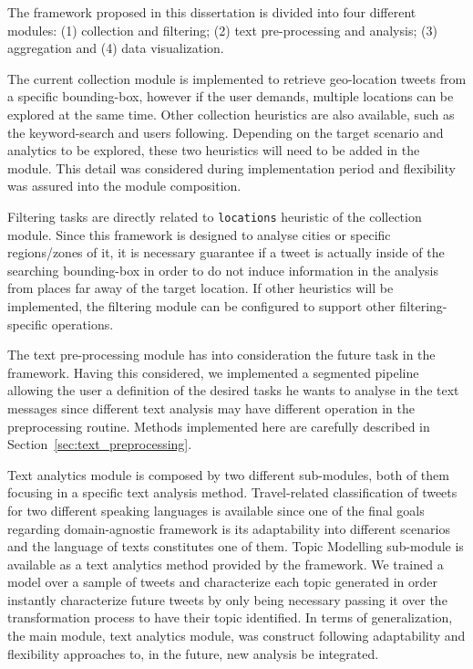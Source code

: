 The framework proposed in this dissertation is divided into four different modules: (1) collection and filtering; (2) text pre-processing and analysis; (3) aggregation and (4) data visualization.

The current collection module is implemented to retrieve geo-location tweets from a specific bounding-box, however if the user demands, multiple locations can be explored at the same time. Other collection heuristics are also available, such as the keyword-search and users following. Depending on the target scenario and analytics to be explored, these two heuristics will need to be added in the module. This detail was considered during implementation period and flexibility was assured into the module composition.

Filtering tasks are directly related to \texttt{locations} heuristic of the collection module. Since this framework is designed to analyse cities or specific regions/zones of it, it is necessary guarantee if a tweet is actually inside of the searching bounding-box in order to do not induce information in the analysis from places far away of the target location. If other heuristics will be implemented, the filtering module can be configured to support other filtering-specific operations.

The text pre-processing module has into consideration the future task in the framework. Having this considered, we implemented a segmented pipeline allowing the user a definition of the desired tasks he wants to analyse in the text messages since different text analysis may have different operation in the preprocessing routine. Methods implemented here are carefully described in Section~\ref{sec:text_preprocessing}.

Text analytics module is composed by two different sub-modules, both of them focusing in a specific text analysis method. Travel-related classification of tweets for two different speaking languages is available since one of the final goals regarding domain-agnostic framework is its adaptability into different scenarios and the language of texts constitutes one of them. Topic Modelling sub-module is available as a text analytics method provided by the framework. We trained a model over a sample of tweets and characterize each topic generated in order instantly characterize future tweets by only being necessary passing it over the transformation process to have their topic identified.
In terms of generalization, the main module, text analytics module, was construct following adaptability and flexibility approaches to, in the future, new analysis be integrated.

